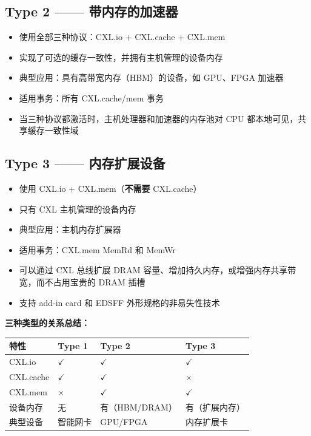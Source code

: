 \documentclass[12pt,a4paper]{article}
\begin{document}
\subsection{Type 2 —— 带内存的加速器}

\begin{keypoint}[Type 2 设备]
\begin{itemize}
    \item 使用全部三种协议：CXL.io + CXL.cache + CXL.mem
    \item 实现了可选的缓存一致性，并拥有主机管理的设备内存
    \item 典型应用：具有高带宽内存（HBM）的设备，如 GPU、FPGA 加速器
    \item 适用事务：所有 CXL.cache/mem 事务
    \item 当三种协议都激活时，主机处理器和加速器的内存池对 CPU 都本地可见，共享缓存一致性域
\end{itemize}
\end{keypoint}

\subsection{Type 3 —— 内存扩展设备}

\begin{keypoint}[Type 3 设备]
\begin{itemize}
    \item 使用 CXL.io + CXL.mem（\textbf{不需要} CXL.cache）
    \item 只有 CXL 主机管理的设备内存
    \item 典型应用：主机内存扩展器
    \item 适用事务：CXL.mem MemRd 和 MemWr
    \item 可以通过 CXL 总线扩展 DRAM 容量、增加持久内存，或增强内存共享带宽，而不占用宝贵的 DRAM 插槽
    \item 支持 add-in card 和 EDSFF 外形规格的非易失性技术
\end{itemize}
\end{keypoint}

\begin{analysisbox}
\textbf{三种类型的关系总结：}

\begin{tabularx}{\textwidth}{@{}lXXX@{}}
\toprule
\textbf{特性} & \textbf{Type 1} & \textbf{Type 2} & \textbf{Type 3} \\
\midrule
CXL.io & $\checkmark$ & $\checkmark$ & $\checkmark$ \\
CXL.cache & $\checkmark$ & $\checkmark$ & $\times$ \\
CXL.mem & $\times$ & $\checkmark$ & $\checkmark$ \\
设备内存 & 无 & 有（HBM/DRAM） & 有（扩展内存） \\
典型设备 & 智能网卡 & GPU/FPGA & 内存扩展卡 \\
\bottomrule
\end{tabularx}
\end{analysisbox}
\end{document}
